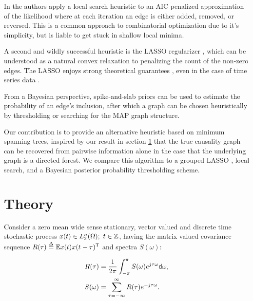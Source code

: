\documentclass[12pt]{article}
\begin{document}
In \cite{bach2004learning} the authors apply a local search heuristic
to an AIC penalized approximation of the likelihood where at each
iteration an edge is either added, removed, or reversed.  This is a
common approach to combinatorial optimization due to it's simplicity,
but is liable to get stuck in shallow local minima.

A second and wildly successful heuristic is the LASSO regularizer
\cite{tibshirani1996regression}, which can be understood as a natural
convex relaxation to penalizing the count of the non-zero edges.  The
LASSO enjoys strong theoretical guarantees \cite{wainwright2009sharp},
even in the case of time series data \cite{basu2015}
\cite{wong2016lasso}.

From a Bayesian perspective, spike-and-slab priors can be used to
estimate the probability of an edge's inclusion, after which a graph
can be chosen heuristically by thresholding or searching for the MAP
graph structure.

Our contribution is to provide an alternative heuristic based on
minimum spanning trees, inspired by our result in section
\ref{sec:theory} that the true causality graph can be recovered from
pairwise information alone in the case that the underlying graph is a
directed forest.  We compare this algorithm to a grouped LASSO
\cite{yuan2006model}, local search, and a Bayesian posterior
probability thresholding scheme.


\section{Theory}
\label{sec:theory}
Consider a zero mean wide sense stationary, vector valued and discrete
time stochastic process $x(t) \in L^n_2(\Omega);\ t \in \mathbb{Z}$, having the matrix
valued covariance sequence
$R(\tau) \overset{\Delta}{=} \mathbb{E} x(t)x(t - \tau)^{\mathsf{T}}$ and spectra $S(\omega)$:

\begin{equation}
  \label{eqn:fourier_pair}
  \begin{aligned}
    R(\tau) &= \frac{1}{2\pi}\int_{-\pi}^\pi S(\omega) e^{j\tau\omega}\mathsf{d} \omega,\\
    S(\omega) &= \sum_{\tau=-\infty}^\infty R(\tau)e^{-j\tau\omega}.
  \end{aligned}
\end{equation}
\end{document}
